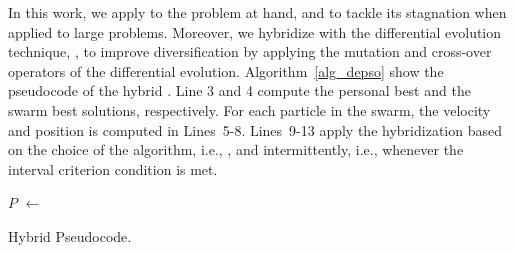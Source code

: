 In this work, we apply \hcpso{} to the problem at hand, and to tackle its stagnation when applied to large problems. Moreover, we hybridize \pso{} with the differential evolution technique, \depso{}, to improve diversification by applying the mutation and cross-over operators of the differential evolution. Algorithm~\ref{alg_depso} show the pseudocode of the hybrid \pso{}. Line 3 and 4 compute the personal best and the swarm best solutions, respectively. For each particle in the swarm, the velocity and position is computed in Lines~5-8. Lines~9-13 apply the hybridization based on the choice of the algorithm, i.e., \de, \hcpso{} and \shpso{} intermittently, i.e., whenever the interval criterion condition is met.
\IncMargin{1em}
\begin{algorithm}[H]
\SetAlgoLined
{}

\BlankLine
{}
\BlankLine
\Particles $P$ $\leftarrow$ \InitPSO{}\;
\BlankLine
{}
 \caption{Hybrid \pso{} Pseudocode.}
 \label{alg_depso}
\end{algorithm}\DecMargin{1em}

